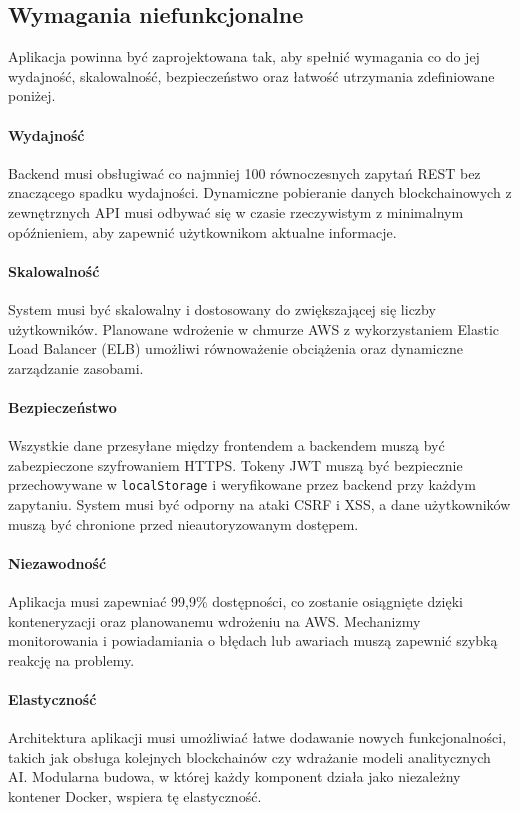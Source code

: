 \subsection{Wymagania niefunkcjonalne}
Aplikacja powinna być zaprojektowana tak, aby spełnić wymagania co do jej wydajność, skalowalność, bezpieczeństwo oraz łatwość utrzymania zdefiniowane poniżej.

\paragraph{Wydajność}
Backend musi obsługiwać co najmniej 100 równoczesnych zapytań REST bez znaczącego spadku wydajności. Dynamiczne pobieranie danych blockchainowych z zewnętrznych API musi odbywać się w czasie rzeczywistym z minimalnym opóźnieniem, aby zapewnić użytkownikom aktualne informacje.

\paragraph{Skalowalność}
System musi być skalowalny i dostosowany do zwiększającej się liczby użytkowników. Planowane wdrożenie w chmurze AWS z wykorzystaniem Elastic Load Balancer (ELB) umożliwi równoważenie obciążenia oraz dynamiczne zarządzanie zasobami.

\paragraph{Bezpieczeństwo}
Wszystkie dane przesyłane między frontendem a backendem muszą być zabezpieczone szyfrowaniem HTTPS. Tokeny JWT muszą być bezpiecznie przechowywane w \texttt{localStorage} i weryfikowane przez backend przy każdym zapytaniu. System musi być odporny na ataki CSRF i XSS, a dane użytkowników muszą być chronione przed nieautoryzowanym dostępem.

\paragraph{Niezawodność}
Aplikacja musi zapewniać 99,9\% dostępności, co zostanie osiągnięte dzięki konteneryzacji oraz planowanemu wdrożeniu na AWS. Mechanizmy monitorowania i powiadamiania o błędach lub awariach muszą zapewnić szybką reakcję na problemy.

\paragraph{Elastyczność}
Architektura aplikacji musi umożliwiać łatwe dodawanie nowych funkcjonalności, takich jak obsługa kolejnych blockchainów czy wdrażanie modeli analitycznych AI. Modularna budowa, w której każdy komponent działa jako niezależny kontener Docker, wspiera tę elastyczność.

